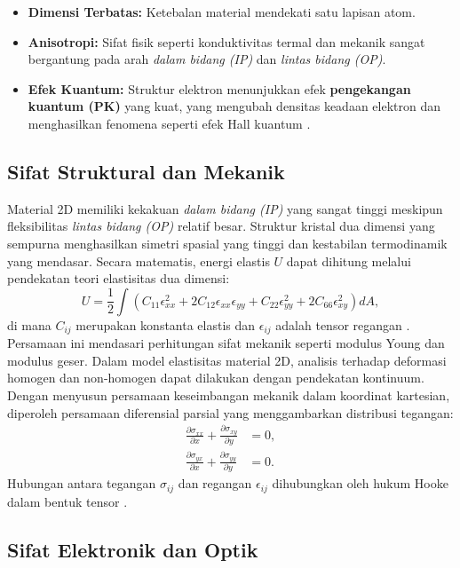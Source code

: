 \begin{itemize}
    \item \textbf{Dimensi Terbatas:} Ketebalan material mendekati satu lapisan atom. \item \textbf{Anisotropi:} Sifat fisik seperti konduktivitas termal dan mekanik sangat bergantung pada arah \emph{dalam bidang (IP)} dan \emph{lintas bidang (OP)}. \item \textbf{Efek Kuantum:} Struktur elektron menunjukkan efek \textbf{pengekangan kuantum (PK)} yang kuat, yang mengubah densitas keadaan elektron dan menghasilkan fenomena seperti efek Hall kuantum \citep{Das2015}. \end{itemize}

\subsection{Sifat Struktural dan Mekanik}
Material 2D memiliki kekakuan \emph{dalam bidang (IP)} yang sangat tinggi meskipun fleksibilitas \emph{lintas bidang (OP)} relatif besar. Struktur kristal dua dimensi yang sempurna menghasilkan simetri spasial yang tinggi dan kestabilan termodinamik yang mendasar. Secara matematis, energi elastis \( U \) dapat dihitung melalui pendekatan teori elastisitas dua dimensi:
\begin{equation}
    U = \frac{1}{2} \int \left( C_{11}\epsilon_{xx}^2 + 2C_{12}\epsilon_{xx}\epsilon_{yy} + C_{22}\epsilon_{yy}^2 + 2C_{66}\epsilon_{xy}^2 \right) dA,
\end{equation}
di mana \( C_{ij} \) merupakan konstanta elastis dan \( \epsilon_{ij} \) adalah tensor regangan \citep{Lee2008}. Persamaan ini mendasari perhitungan sifat mekanik seperti modulus Young dan modulus geser. Dalam model elastisitas material 2D, analisis terhadap deformasi homogen dan non-homogen dapat dilakukan dengan pendekatan kontinuum. Dengan menyusun persamaan keseimbangan mekanik dalam koordinat kartesian, diperoleh persamaan diferensial parsial yang menggambarkan distribusi tegangan:
\begin{align}
    \frac{\partial \sigma_{xx}}{\partial x} + \frac{\partial \sigma_{xy}}{\partial y} &= 0, \nonumber \\
    \frac{\partial \sigma_{yx}}{\partial x} + \frac{\partial \sigma_{yy}}{\partial y} &= 0.
\end{align}
Hubungan antara tegangan \( \sigma_{ij} \) dan regangan \( \epsilon_{ij} \) dihubungkan oleh hukum Hooke dalam bentuk tensor \citep{Timoshenko1970}. \subsection{Sifat Elektronik dan Optik}
